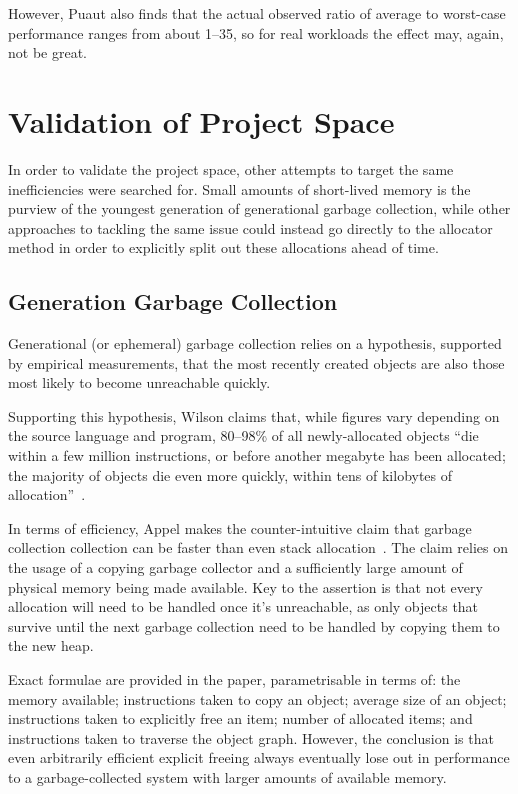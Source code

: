 However, Puaut also finds that the actual observed ratio of average to worst-case performance ranges from about 1–35, so for real workloads the effect may, again, not be great.

\section{Validation of Project Space}

In order to validate the project space, other attempts to target the same inefficiencies were searched for. Small amounts of short-lived memory is the purview of the youngest generation of generational garbage collection, while other approaches to tackling the same issue could instead go directly to the allocator method in order to explicitly split out these allocations ahead of time.

\subsection{Generation Garbage Collection}

Generational (or ephemeral) garbage collection relies on a hypothesis, supported by empirical measurements, that the most recently created objects are also those most likely to become unreachable quickly.

Supporting this hypothesis, Wilson claims that, while figures vary depending on the source language and program, 80–98\% of all newly-allocated objects ``die within a few million instructions, or before another megabyte has been allocated; the majority of objects die even more quickly, within tens of kilobytes of allocation''~\cite{uniprocessorgc}.

In terms of efficiency, Appel makes the counter-intuitive claim that garbage collection collection can be faster than even stack allocation~\cite{stackvgc}. The claim relies on the usage of a copying garbage collector and a sufficiently large amount of physical memory being made available. Key to the assertion is that not every allocation will need to be handled once it's unreachable, as only objects that survive until the next garbage collection need to be handled by copying them to the new heap.

Exact formulae are provided in the paper, parametrisable in terms of: the memory available; instructions taken to copy an object; average size of an object; instructions taken to explicitly free an item; number of allocated items; and instructions taken to traverse the object graph. However, the conclusion is that even arbitrarily efficient explicit freeing always eventually lose out in performance to a garbage-collected system with larger amounts of available memory.

